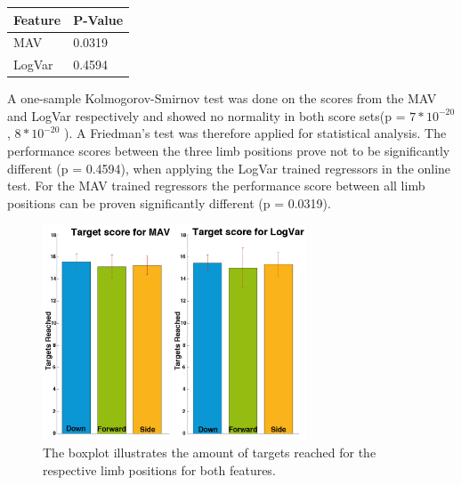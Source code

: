 	\begin{center}
		\begin{tabular}{l l}
			\toprule
			\textbf{Feature} & \textbf{P-Value}\\
			\midrule
			MAV & 0.0319 \\
			LogVar & 0.4594 \\
			\bottomrule
		\end{tabular}
	\end{center}

A one-sample Kolmogorov-Smirnov test was done on the scores from the MAV and LogVar respectively and showed no normality in both score sets(p = $7 * 10^{-20}$, $8 * 10^{-20}$ ). A Friedman's test was therefore applied for statistical analysis. The performance scores between the three limb positions prove not to be significantly different (p = 0.4594), when applying the LogVar trained regressors in the online test. For the MAV trained regressors the performance score between all limb positions can be proven significantly different (p = 0.0319). 

\begin{figure}[H]
	\includegraphics[width=0.7\textwidth]{figures/results/TargetsReached}  %
	\caption{The boxplot illustrates the amount of targets reached for the respective limb positions for both features.}
	\label{fig:TargetsReached}  %
\end{figure}

